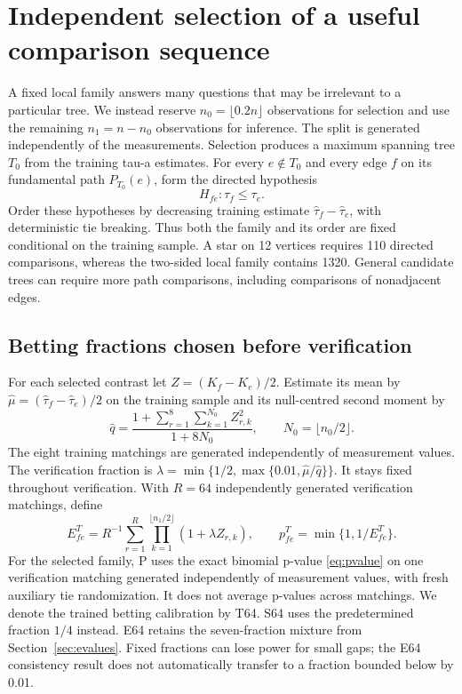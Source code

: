 \section{Independent selection of a useful comparison sequence}\label{sec:selected}
A fixed local family answers many questions that may be irrelevant to a particular tree. We instead reserve $n_0=\lfloor0.2n\rfloor$ observations for selection and use the remaining $n_1=n-n_0$ observations for inference. The split is generated independently of the measurements. Selection produces a maximum spanning tree $T_0$ from the training tau-a estimates. For every $e\notin T_0$ and every edge $f$ on its fundamental path $P_{T_0}(e)$, form the directed hypothesis
\[
 H_{fe}:\tau_f\le\tau_e.
\]
Order these hypotheses by decreasing training estimate $\widehat\tau_f-\widehat\tau_e$, with deterministic tie breaking. Thus both the family and its order are fixed conditional on the training sample. A star on 12 vertices requires 110 directed comparisons, whereas the two-sided local family contains 1320. General candidate trees can require more path comparisons, including comparisons of nonadjacent edges.

\subsection{Betting fractions chosen before verification}
For each selected contrast let $Z=(K_f-K_e)/2$. Estimate its mean by $\widehat\mu=(\widehat\tau_f-\widehat\tau_e)/2$ on the training sample and its null-centred second moment by
\[
 \widehat q=\frac{1+\sum_{r=1}^{8}\sum_{k=1}^{N_0}Z_{r,k}^{2}}{1+8N_0},\qquad N_0=\lfloor n_0/2\rfloor.
\]
The eight training matchings are generated independently of measurement values. The verification fraction is $\lambda=\min\{1/2,\max\{0.01,\widehat\mu/\widehat q\}\}$. It stays fixed throughout verification. With $R=64$ independently generated verification matchings, define
\[
 E^{T}_{fe}=R^{-1}\sum_{r=1}^{R}\prod_{k=1}^{\lfloor n_1/2\rfloor}(1+\lambda Z_{r,k}),
 \qquad p^{T}_{fe}=\min\{1,1/E^{T}_{fe}\}.
\]
For the selected family, P uses the exact binomial p-value \eqref{eq:pvalue} on one verification matching generated independently of measurement values, with fresh auxiliary tie randomization. It does not average p-values across matchings. We denote the trained betting calibration by T64. S64 uses the predetermined fraction $1/4$ instead. E64 retains the seven-fraction mixture from Section~\ref{sec:evalues}. Fixed fractions can lose power for small gaps; the E64 consistency result does not automatically transfer to a fraction bounded below by 0.01.

